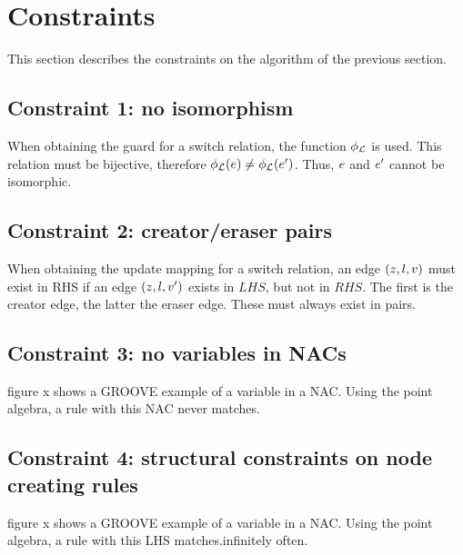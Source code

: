 \section{Constraints}

This section describes the constraints on the algorithm of the previous section.

\subsection{Constraint 1: no isomorphism}
When obtaining the guard for a switch relation, the function $\phi_{\mathcal{L}}$ is used. This relation must be bijective, therefore $\phi_{\mathcal{L}}(e) \neq \phi_{\mathcal{L}}(e')$. Thus, $e$ and $e'$ cannot be isomorphic.

\subsection{Constraint 2: creator/eraser pairs}
When obtaining the update mapping for a switch relation, an edge $(z, l, v)$ must exist in RHS if an edge $(z, l, v')$ exists in $LHS$, but not in $RHS$. The first is the creator edge, the latter the eraser edge. These must always exist in pairs. 

\subsection{Constraint 3: no variables in NACs}
figure x shows a GROOVE example of a variable in a NAC. Using the point algebra, a rule with this NAC never matches.

\subsection{Constraint 4: structural constraints on node creating rules}
figure x shows a GROOVE example of a variable in a NAC. Using the point algebra, a rule with this LHS matches.infinitely often.
